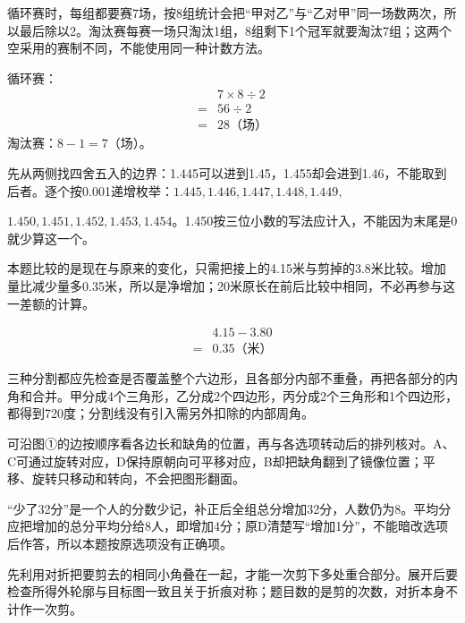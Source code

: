 \documentclass[multi=snippet,border=0pt]{standalone}
\newenvironment{snippet}[3]{\begin{minipage}{#1bp}\color{answerred}\fontsize{#2}{#3}\selectfont\raggedright}{\end{minipage}}
\begin{document}
\begin{snippet}{505}{11.5}{14}循环赛时，每组都要赛7场，按8组统计会把“甲对乙”与“乙对甲”同一场数两次，所以最后除以2。淘汰赛每赛一场只淘汰1组，8组剩下1个冠军就要淘汰7组；这两个空采用的赛制不同，不能使用同一种计数方法。\par 循环赛：\[\begin{aligned}&7\times8\div2\\={}&56\div2\\={}&28\text{（场）}\end{aligned}\]淘汰赛：\(8-1=7\)（场）。\end{snippet}
\begin{snippet}{505}{11.5}{14}先从两侧找四舍五入的边界：1.445可以进到1.45，1.455却会进到1.46，不能取到后者。逐个按0.001递增枚举：\(1.445,1.446,1.447,1.448,1.449,\)\par \(1.450,1.451,1.452,1.453,1.454\)。1.450按三位小数的写法应计入，不能因为末尾是0就少算这一个。\end{snippet}
\begin{snippet}{505}{11.5}{14}本题比较的是现在与原来的变化，只需把接上的4.15米与剪掉的3.8米比较。增加量比减少量多0.35米，所以是净增加；20米原长在前后比较中相同，不必再参与这一差额的计算。\par \[\begin{aligned}&4.15-3.80\\={}&0.35\text{（米）}\end{aligned}\]\end{snippet}
\begin{snippet}{505}{11.5}{14}三种分割都应先检查是否覆盖整个六边形，且各部分内部不重叠，再把各部分的内角和合并。甲分成4个三角形，乙分成2个四边形，丙分成2个三角形和1个四边形，都得到720度；分割线没有引入需另外扣除的内部周角。\end{snippet}
\begin{snippet}{505}{11.5}{14}可沿图①的边按顺序看各边长和缺角的位置，再与各选项转动后的排列核对。A、C可通过旋转对应，D保持原朝向可平移对应，B却把缺角翻到了镜像位置；平移、旋转只移动和转向，不会把图形翻面。\end{snippet}
\begin{snippet}{505}{11.5}{14}“少了32分”是一个人的分数少记，补正后全组总分增加32分，人数仍为8。平均分应把增加的总分平均分给8人，即增加4分；原D清楚写“增加1分”，不能暗改选项后作答，所以本题按原选项没有正确项。\end{snippet}
\begin{snippet}{505}{11.5}{14}先利用对折把要剪去的相同小角叠在一起，才能一次剪下多处重合部分。展开后要检查所得外轮廓与目标图一致且关于折痕对称；题目数的是剪的次数，对折本身不计作一次剪。\end{snippet}
\end{document}
